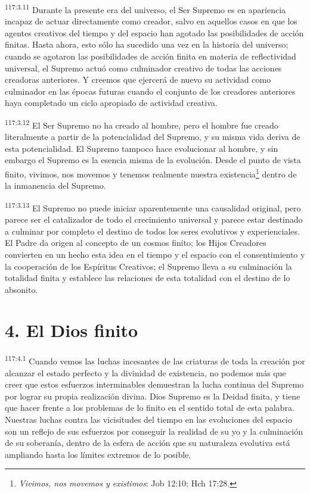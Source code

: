 \par
\textsuperscript{117:3.11} Durante la presente era del universo, el Ser Supremo es en apariencia incapaz de actuar directamente como creador, salvo en aquellos casos en que los agentes creativos del tiempo y del espacio han agotado las posibilidades de acción finitas. Hasta ahora, esto sólo ha sucedido una vez en la historia del universo; cuando se agotaron las posibilidades de acción finita en materia de reflectividad universal, el Supremo actuó como culminador creativo de todas las acciones creadoras anteriores. Y creemos que ejercerá de nuevo su actividad como culminador en las épocas futuras cuando el conjunto de los creadores anteriores haya completado un ciclo apropiado de actividad creativa.

\par
\textsuperscript{117:3.12} El Ser Supremo no ha creado al hombre, pero el hombre fue creado literalmente a partir de la potencialidad del Supremo, y su misma vida deriva de esta potencialidad. El Supremo tampoco hace evolucionar al hombre, y sin embargo el Supremo es la esencia misma de la evolución. Desde el punto de vista finito, vivimos, nos movemos y tenemos realmente nuestra existencia\footnote{\textit{Vivimos, nos movemos y existimos}: Job 12:10; Hch 17:28.} dentro de la inmanencia del Supremo.

\par
\textsuperscript{117:3.13} El Supremo no puede iniciar aparentemente una causalidad original, pero parece ser el catalizador de todo el crecimiento universal y parece estar destinado a culminar por completo el destino de todos los seres evolutivos y experienciales. El Padre da origen al concepto de un cosmos finito; los Hijos Creadores convierten en un hecho esta idea en el tiempo y el espacio con el consentimiento y la cooperación de los Espíritus Creativos; el Supremo lleva a su culminación la totalidad finita y establece las relaciones de esta totalidad con el destino de lo absonito.

\section*{4. El Dios finito}
\par
\textsuperscript{117:4.1} Cuando vemos las luchas incesantes de las criaturas de toda la creación por alcanzar el estado perfecto y la divinidad de existencia, no podemos más que creer que estos esfuerzos interminables demuestran la lucha continua del Supremo por lograr su propia realización divina. Dios Supremo es la Deidad finita, y tiene que hacer frente a los problemas de lo finito en el sentido total de esta palabra. Nuestras luchas contra las vicisitudes del tiempo en las evoluciones del espacio son un reflejo de sus esfuerzos por conseguir la realidad de su yo y la culminación de su soberanía, dentro de la esfera de acción que su naturaleza evolutiva está ampliando hasta los límites extremos de lo posible.

